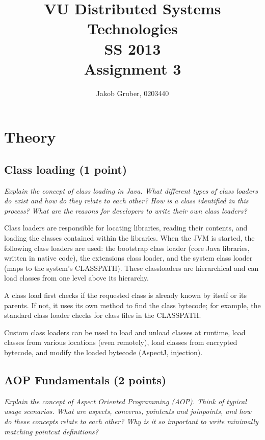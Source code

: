 \documentclass[a4paper,10pt]{article}
\title{VU Distributed Systems Technologies \\
       SS 2013 \\
       Assignment 3}
\author{Jakob Gruber, 0203440}
\begin{document}
\maketitle

\vspace{3mm}

\section{Theory}

\subsection{Class loading (1 point)}

\emph{Explain the concept of class loading in Java. What different types of class loaders do exist and how do
they relate to each other? How is a class identified in this process? What are the reasons for developers
to write their own class loaders?}

\vspace{3mm}

Class loaders are responsible for locating libraries, reading their contents,
and loading the classes contained within the libraries. When the JVM is
started, the following class loaders are used: the bootstrap class loader (core
Java libraries, written in native code), the extensions class loader, and the
system class loader (maps to the system's CLASSPATH). These classloaders are hierarchical
and can load classes from one level above its hierarchy.

A class load first checks if the requested class is already known by itself
or its parents. If not, it uses its own method to find the class bytecode; for example,
the standard class loader checks for class files in the CLASSPATH.
 
Custom class loaders can be used to load and unload classes at runtime, load
classes from various locations (even remotely), load classes from encrypted
bytecode, and modify the loaded bytecode (AspectJ, injection).

\subsection{AOP Fundamentals (2 points)}

\emph{Explain the concept of Aspect Oriented Programming (AOP). Think of typical usage scenarios. What
are aspects, concerns, pointcuts and joinpoints, and how do these concepts relate to each other?
Why is it so important to write minimally matching pointcut definitions?}
\end{document}

